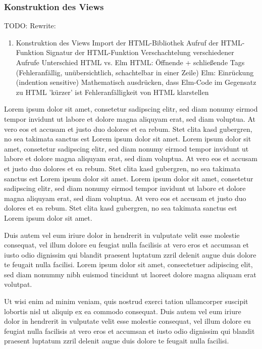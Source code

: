 \subsubsection{Konstruktion des Views}
\label{sec:Konstruktion des Views}
TODO: Rewrite:
\begin{enumerate}
	\item Konstruktion des Views
	\subitem{-} Import der HTML-Bibliothek
	\subitem{-} Aufruf der HTML-Funktion
	\subitem{-} Signatur der HTML-Funktion
	\subitem{-} Verschachtelung verschiedener Aufrufe
	\subitem{-} Unterschied HTML vs. Elm
		\subsubitem{-} HTML: Öffnende + schließende Tags (Fehleranfällig, unübersichtlich, schachtelbar in einer Zeile)
		\subsubitem{-} Elm: Einrückung (indention sensitive)
	\subitem{-} Mathematisch ausdrücken, dass Elm-Code im Gegensatz zu HTML 'kürzer' ist
	\subitem{-} Fehleranfälligkeit von HTML klarstellen
\end{enumerate}


Lorem ipsum dolor sit amet, consetetur sadipscing elitr, sed diam nonumy eirmod tempor invidunt ut labore et dolore magna aliquyam erat, sed diam voluptua. At vero eos et accusam et justo duo dolores et ea rebum. Stet clita kasd gubergren, no sea takimata sanctus est Lorem ipsum dolor sit amet. Lorem ipsum dolor sit amet, consetetur sadipscing elitr, sed diam nonumy eirmod tempor invidunt ut labore et dolore magna aliquyam erat, sed diam voluptua. At vero eos et accusam et justo duo dolores et ea rebum. Stet clita kasd gubergren, no sea takimata sanctus est Lorem ipsum dolor sit amet. Lorem ipsum dolor sit amet, consetetur sadipscing elitr, sed diam nonumy eirmod tempor invidunt ut labore et dolore magna aliquyam erat, sed diam voluptua. At vero eos et accusam et justo duo dolores et ea rebum. Stet clita kasd gubergren, no sea takimata sanctus est Lorem ipsum dolor sit amet.   

Duis autem vel eum iriure dolor in hendrerit in vulputate velit esse molestie consequat, vel illum dolore eu feugiat nulla facilisis at vero eros et accumsan et iusto odio dignissim qui blandit praesent luptatum zzril delenit augue duis dolore te feugait nulla facilisi. Lorem ipsum dolor sit amet, consectetuer adipiscing elit, sed diam nonummy nibh euismod tincidunt ut laoreet dolore magna aliquam erat volutpat.   

Ut wisi enim ad minim veniam, quis nostrud exerci tation ullamcorper suscipit lobortis nisl ut aliquip ex ea commodo consequat. Duis autem vel eum iriure dolor in hendrerit in vulputate velit esse molestie consequat, vel illum dolore eu feugiat nulla facilisis at vero eros et accumsan et iusto odio dignissim qui blandit praesent luptatum zzril delenit augue duis dolore te feugait nulla facilisi.   


